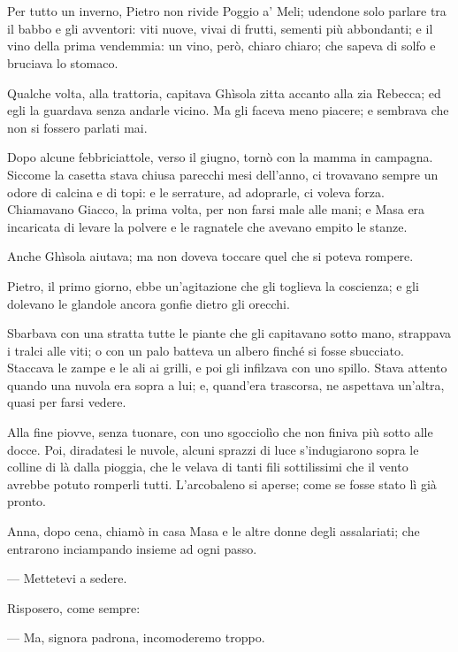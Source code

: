 \chapter{}

Per tutto un inverno, Pietro non rivide Poggio a’ Meli; udendone solo parlare tra il babbo e gli avventori: viti nuove, vivai di frutti, sementi più abbondanti; e il vino della prima vendemmia: un vino, però, chiaro chiaro; che sapeva di solfo e bruciava lo stomaco.

Qualche volta, alla trattoria, capitava Ghìsola zitta accanto alla zia Rebecca; ed egli la guardava senza andarle vicino. Ma gli faceva meno piacere; e sembrava che non si fossero parlati mai.

Dopo alcune febbriciattole, verso il giugno, tornò con la mamma in campagna. Siccome la casetta stava chiusa parecchi mesi dell'anno, ci trovavano sempre un odore di calcina e di topi: e le serrature, ad adoprarle, ci voleva forza. Chiamavano Giacco, la prima volta, per non farsi male alle mani; e Masa era incaricata di levare la polvere e le ragnatele che avevano empito le stanze.

Anche Ghìsola aiutava; ma non doveva toccare quel che si poteva rompere.

Pietro, il primo giorno, ebbe un'agitazione che gli toglieva la coscienza; e gli dolevano le glandole ancora gonfie dietro gli orecchi.

Sbarbava con una stratta tutte le piante che gli capitavano sotto mano, strappava i tralci alle viti; o con un palo batteva un albero finché si fosse sbucciato. Staccava le zampe e le ali ai grilli, e poi gli infilzava con uno spillo. Stava attento quando una nuvola era sopra a lui; e, quand'era trascorsa, ne aspettava un'altra, quasi per farsi vedere.

Alla fine piovve, senza tuonare, con uno sgocciolìo che non finiva più sotto alle docce. Poi, diradatesi le nuvole, alcuni sprazzi di luce s'indugiarono sopra le colline di là dalla pioggia, che le velava di tanti fili sottilissimi che il vento avrebbe potuto romperli tutti. L'arcobaleno si aperse; come se fosse stato lì già pronto.

Anna, dopo cena, chiamò in casa Masa e le altre donne degli assalariati; che entrarono inciampando insieme ad ogni passo.

— Mettetevi a sedere.

Risposero, come sempre:

— Ma, signora padrona, incomoderemo troppo.

